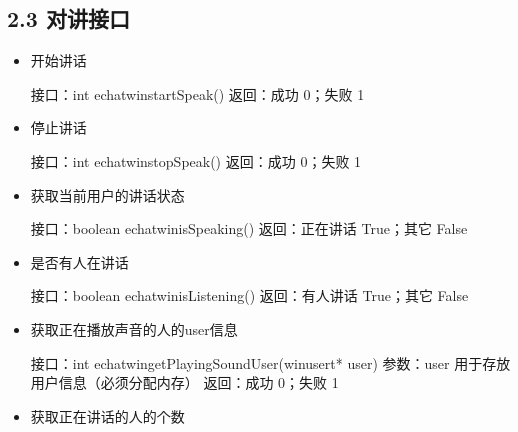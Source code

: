 \documentclass[letterpaper,10pt,english]{sphinxmanual}
\begin{document}
\subsection{2.3 对讲接口}
\label{\detokenize{c_win:id5}}\begin{itemize}
\item {} 
开始讲话

%
\begin{sphinxVerbatim}[commandchars=\\\{\}]
接口：int echat\PYGZus{}win\PYGZus{}startSpeak()
返回：成功 0；失败 \PYGZhy{}1
\end{sphinxVerbatim}

\item {} 
停止讲话

%
\begin{sphinxVerbatim}[commandchars=\\\{\}]
接口：int echat\PYGZus{}win\PYGZus{}stopSpeak()
返回：成功 0；失败 \PYGZhy{}1
\end{sphinxVerbatim}

\item {} 
获取当前用户的讲话状态

%
\begin{sphinxVerbatim}[commandchars=\\\{\}]
接口：boolean echat\PYGZus{}win\PYGZus{}isSpeaking()
返回：正在讲话 True；其它 False
\end{sphinxVerbatim}

\item {} 
是否有人在讲话

%
\begin{sphinxVerbatim}[commandchars=\\\{\}]
接口：boolean echat\PYGZus{}win\PYGZus{}isListening()
返回：有人讲话 True；其它 False
\end{sphinxVerbatim}

\item {} 
获取正在播放声音的人的user信息

%
\begin{sphinxVerbatim}[commandchars=\\\{\}]
接口：int echat\PYGZus{}win\PYGZus{}getPlayingSoundUser(win\PYGZus{}user\PYGZus{}t* user)
参数：user  用于存放用户信息（必须分配内存）
返回：成功 0；失败 \PYGZhy{}1
\end{sphinxVerbatim}

\item {} 
获取正在讲话的人的个数


\end{itemize}
\end{document}
